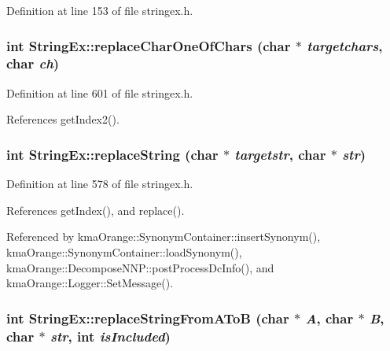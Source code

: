 Definition at line 153 of file stringex.h.\hypertarget{classStringEx_1dc160e24fe7a9eddb7e0ac5ac71a6ba}{
\subsubsection[{replaceCharOneOfChars}]{\setlength{\rightskip}{0pt plus 5cm}int StringEx::replaceCharOneOfChars (char $\ast$ {\em targetchars}, \/  char {\em ch})}}
\label{classStringEx_1dc160e24fe7a9eddb7e0ac5ac71a6ba}




Definition at line 601 of file stringex.h.

References getIndex2().\hypertarget{classStringEx_36d8239844aff03b54954f8e888fdf7b}{
\subsubsection[{replaceString}]{\setlength{\rightskip}{0pt plus 5cm}int StringEx::replaceString (char $\ast$ {\em targetstr}, \/  char $\ast$ {\em str})}}
\label{classStringEx_36d8239844aff03b54954f8e888fdf7b}




Definition at line 578 of file stringex.h.

References getIndex(), and replace().

Referenced by kmaOrange::SynonymContainer::insertSynonym(), kmaOrange::SynonymContainer::loadSynonym(), kmaOrange::DecomposeNNP::postProcessDcInfo(), and kmaOrange::Logger::SetMessage().\hypertarget{classStringEx_1ff835f987af94b21d5e0624039dfb62}{
\subsubsection[{replaceStringFromAToB}]{\setlength{\rightskip}{0pt plus 5cm}int StringEx::replaceStringFromAToB (char $\ast$ {\em A}, \/  char $\ast$ {\em B}, \/  char $\ast$ {\em str}, \/  int {\em isIncluded})}}
\label{classStringEx_1ff835f987af94b21d5e0624039dfb62}




